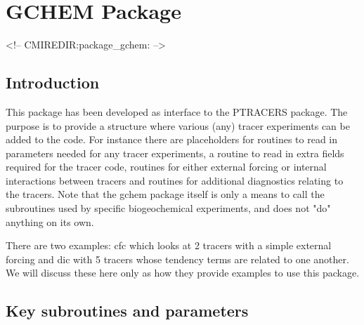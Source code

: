 \section {GCHEM Package} 
\label{sec:pkg:gchem}
\begin{rawhtml}
<!-- CMIREDIR:package_gchem: -->
\end{rawhtml}

\subsection {Introduction}
This package has been developed as interface to the PTRACERS package.
The purpose is to provide a structure where various (any)
tracer experiments can be added to the code.
For instance there are placeholders for routines
to read in parameters needed for any tracer experiments, a routine
to read in extra fields required for the tracer code, routines
for either external forcing or internal interactions between tracers
and routines for additional diagnostics relating to the tracers.
Note that the gchem package itself is only a means to call
the subroutines used by specific biogeochemical experiments,
and does not "do" anything on its own.

There are two examples: cfc which looks at 2 tracers with a
simple external forcing and dic with 5 tracers whose tendency terms
are related to one another. We will discuss these here only as
how they provide examples to use this package.


\subsection {Key subroutines and parameters}

